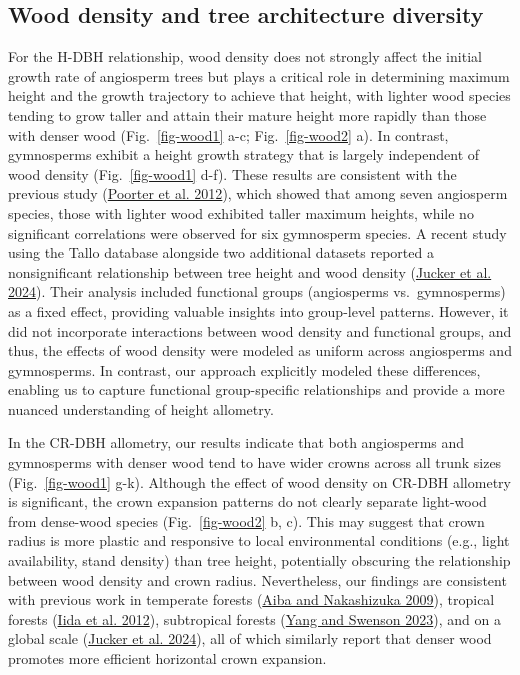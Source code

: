 \documentclass[
  12pt,
  letterpaper,
  DIV=11,
  numbers=noendperiod]{scrartcl}
\begin{document}
\hypertarget{wood-density-and-tree-architecture-diversity}{%
\subsection{Wood density and tree architecture
diversity}\label{wood-density-and-tree-architecture-diversity}}

For the H-DBH relationship, wood density does not strongly affect the
initial growth rate of angiosperm trees but plays a critical role in
determining maximum height and the growth trajectory to achieve that
height, with lighter wood species tending to grow taller and attain
their mature height more rapidly than those with denser wood
(Fig.~\ref{fig-wood1} a-c; Fig.~\ref{fig-wood2} a). In contrast,
gymnosperms exhibit a height growth strategy that is largely independent
of wood density (Fig.~\ref{fig-wood1} d-f). These results are consistent
with the previous study (\protect\hyperlink{ref-Poorter2012a}{Poorter et
al. 2012}), which showed that among seven angiosperm species, those with
lighter wood exhibited taller maximum heights, while no significant
correlations were observed for six gymnosperm species. A recent study
using the Tallo database alongside two additional datasets reported a
nonsignificant relationship between tree height and wood density
(\protect\hyperlink{ref-Jucker2024}{Jucker et al. 2024}). Their analysis
included functional groups (angiosperms vs.~gymnosperms) as a fixed
effect, providing valuable insights into group-level patterns. However,
it did not incorporate interactions between wood density and functional
groups, and thus, the effects of wood density were modeled as uniform
across angiosperms and gymnosperms. In contrast, our approach explicitly
modeled these differences, enabling us to capture functional
group-specific relationships and provide a more nuanced understanding of
height allometry.

In the CR-DBH allometry, our results indicate that both angiosperms and
gymnosperms with denser wood tend to have wider crowns across all trunk
sizes (Fig.~\ref{fig-wood1} g-k). Although the effect of wood density on
CR-DBH allometry is significant, the crown expansion patterns do not
clearly separate light-wood from dense-wood species
(Fig.~\ref{fig-wood2} b, c). This may suggest that crown radius is more
plastic and responsive to local environmental conditions (e.g., light
availability, stand density) than tree height, potentially obscuring the
relationship between wood density and crown radius. Nevertheless, our
findings are consistent with previous work in temperate forests
(\protect\hyperlink{ref-Aiba2009}{Aiba and Nakashizuka 2009}), tropical
forests (\protect\hyperlink{ref-Iida2012}{Iida et al. 2012}),
subtropical forests (\protect\hyperlink{ref-Yang2023}{Yang and Swenson
2023}), and on a global scale (\protect\hyperlink{ref-Jucker2024}{Jucker
et al. 2024}), all of which similarly report that denser wood promotes
more efficient horizontal crown expansion.
\end{document}
